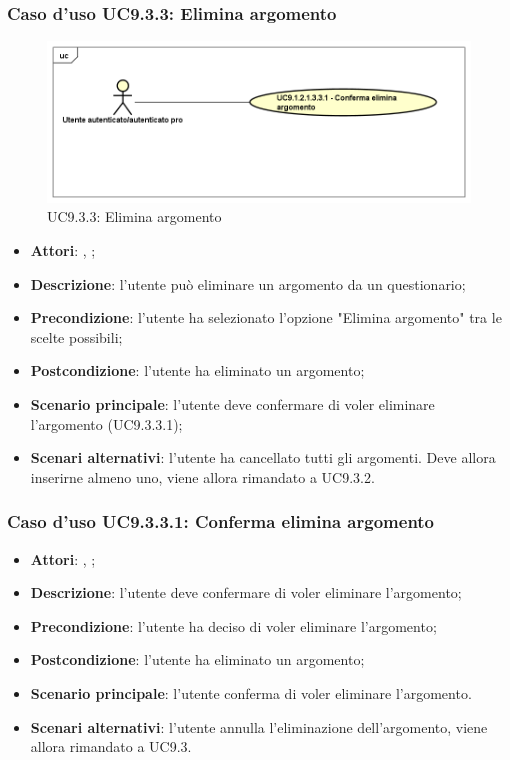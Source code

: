 		 \subsubsection{Caso d'uso UC9.3.3: Elimina argomento}
		 \label{UC9.3.3}
		 \begin{figure}[h]
		 	\centering
		 	\includegraphics[scale=0.5,keepaspectratio]{UML/UC9_1_2_1_3_3.png}
		 	\caption{UC9.3.3: Elimina argomento}
		 \end{figure}
		 \FloatBarrier
		 \begin{itemize}
		 	\item \textbf{Attori}: \uau, \uaupro;
		 	\item \textbf{Descrizione}: l'utente può eliminare un argomento da un questionario;
		 	\item \textbf{Precondizione}: l'utente ha selezionato l'opzione "Elimina argomento" tra le scelte possibili;
		 	\item \textbf{Postcondizione}: l'utente ha eliminato un argomento;
		 	\item \textbf{Scenario principale}: l'utente deve confermare di voler eliminare l'argomento (UC9.3.3.1); 
		 	\item \textbf{Scenari alternativi}: l'utente ha cancellato tutti gli argomenti. Deve allora inserirne almeno uno, viene allora rimandato a UC9.3.2.
		 \end{itemize}
		 
		 \subsubsection{Caso d'uso UC9.3.3.1: Conferma elimina argomento}
		 \label{UC9.3.3.1}
		 \begin{itemize}
		 	\item \textbf{Attori}: \uau, \uaupro;
		 	\item \textbf{Descrizione}: l'utente deve confermare di voler eliminare l'argomento;
		 	\item \textbf{Precondizione}: l'utente ha deciso di voler eliminare l'argomento;
		 	\item \textbf{Postcondizione}: l'utente ha eliminato un argomento;
		 	\item \textbf{Scenario principale}: l'utente conferma di voler eliminare l'argomento. 
		 	\item \textbf{Scenari alternativi}: l'utente annulla l'eliminazione dell'argomento, viene allora rimandato a UC9.3.
		 \end{itemize}						
	 
